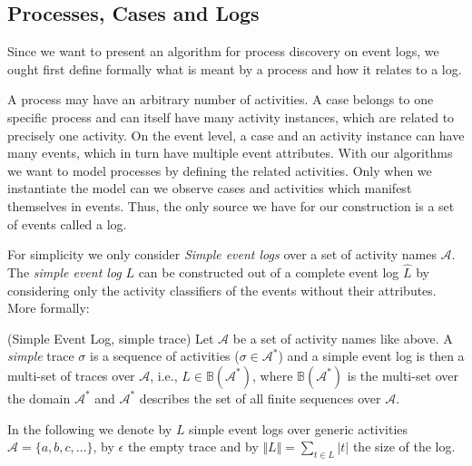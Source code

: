 \documentclass[a4paper]{IEEEtran}
\begin{document}
\subsection{Processes, Cases and Logs}
Since we want to present an algorithm for process discovery on event logs, we ought first define formally what is meant by a process and how it relates to a log. 

A process may have an arbitrary number of activities. A case belongs to one specific process and can itself have many activity instances, which are related to precisely one activity. On the event level, a case and an activity instance can have many events, which in turn have multiple event attributes. With our algorithms we want to model processes by defining the related activities. Only when we instantiate the model can we observe cases and activities which manifest themselves in events. Thus, the only source we have for our construction is a set of events called a log. 

For simplicity we only consider \textit{Simple event logs} over a set of activity names $\mathcal{A}$. The \textit{simple event log} $L$ can be constructed out of a complete event log $\hat{L}$ by considering only the activity classifiers of the events without their attributes. More formally:
\begin{defn} (Simple Event Log, simple trace)
Let $\mathcal{A}$ be a set of activity names like above. A \textit{simple} trace $\sigma$ is a sequence of activities ($\sigma \in \mathcal{A}^*$) and a simple event log is then a multi-set of traces over $\mathcal{A}$, i.e., $L \in \mathbb{B}(\mathcal{A}^*)$, where $\mathbb{B}(\mathcal{A}^*)$ is the multi-set over the domain $\mathcal{A}^*
$ and $\mathcal{A}^*$ describes the set of all finite sequences over $\mathcal{A}$.
\end{defn}

In the following we denote by $L$ simple event logs over generic activities $\mathcal{A} = \{a, b, c, \dots \}$, by $\epsilon$ the empty trace and by $\Vert L \Vert = \sum_{t\in L} |t|$ the size of the log.
\end{document}
